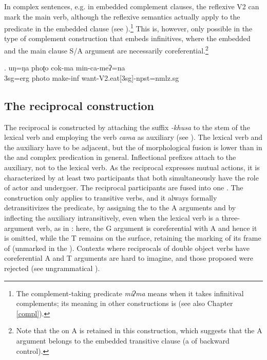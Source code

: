 In complex sentences, e.g. in embedded complement clauses, the reflexive V2 can mark the main verb, although the reflexive semantics actually apply to the predicate in the embedded clause (see \Next).\footnote{The complement-taking predicate \emph{miʔma} means  when it takes infinitival complements; its meaning in other constructions is  (see also Chapter \ref{compl}).} This is, however, only possible in the type of complement construction that embeds infinitives, where the embedded and the main clause  S/A argument are necessarily coreferential.\footnote{Note that the  on A is retained in this construction, which suggests that the A argument belongs to the embedded transitive clause (a  of backward control).} 


\exg. uŋ=ŋa phoʈo cok-ma min-ca-meʔ=na\\
		{\sc 3sg=erg} photo make{\sc -inf} want-{\sc V2.eat[3sg]-npst=nmlz.sg}	\\
 	



\subsection{The reciprocal construction}\label{refl3}

The reciprocal is constructed by attaching the suffix \emph{-khusa} to the stem of the lexical verb and employing the verb \emph{cama}  as auxiliary (see \Next[a]). The lexical verb and the auxiliary have to be adjacent, but the  of morphological fusion is lower than in the  and complex predication in general. Inflectional prefixes attach to the auxiliary, not to the lexical verb. As the reciprocal expresses mutual actions, it is characterized by at least two participants that both simultaneously have the role of actor and undergoer. The reciprocal participants are fused into one . The construction only applies to transitive verbs, and it always formally detransitivizes the predicate, by assigning the   to the A arguments and by inflecting the auxiliary intransitively, even when the lexical verb is a three-argument verb, as in  \Next[b]: here, the G argument  is coreferential with A and hence it is omitted, while the T remains on the surface, retaining the  marking of its frame of  (unmarked  in the ). Contexts where reciprocals of double object verbs have coreferential A and T arguments are hard to imagine, and those proposed were rejected (see ungrammatical \Next[c]). 

